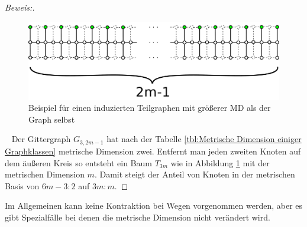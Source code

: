 \begin{proof}[Beweis:]$\;$
\begin{figure}[h!]
		\centering 		 
\includegraphics[width=420pt]{bilder/gitterzubaumlsch.pdf}
   \caption{Beispiel für einen induzierten Teilgraphen mit größerer MD als der Graph selbst}
   \label{bild:Gitterbaum2}
  	 \end{figure}
~ \linebreak
Der Gittergraph $G_{3,2m-1}$ hat nach der Tabelle \ref{tbl:Metrische Dimension einiger Graphklassen} metrische Dimension zwei. Entfernt man jeden zweiten Knoten auf dem äußeren Kreis so entsteht ein Baum $T_{3m}$ wie in Abbildung \ref{bild:Gitterbaum2} mit der metrischen Dimension $m$. Damit steigt der Anteil von Knoten in der metrischen Basis von $6m-3:2$ auf $3m:m$.
\end{proof}


Im Allgemeinen kann keine Kontraktion bei Wegen vorgenommen werden, aber es gibt Spezialfälle bei denen die metrische Dimension nicht verändert wird.
\clearpage
